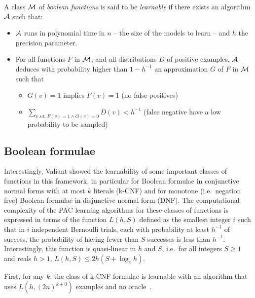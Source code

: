 \documentclass{llncs}
\begin{document}
\begin{definition}
   A class $\cal M$ of \emph{boolean functions} is said to be \emph{learnable}
   if there exists an algorithm $\cal A$ such that:
   \begin{itemize}
      \item $\cal A$ runs in polynomial time in $n$ -- the size of the models to learn -- and $h$ the precision parameter.
      \item
         For all functions $F$ in $\cal M$, and all distributions $D$ of positive examples,
         $\cal A$ deduces with probability higher than $1-h^{-1}$ an approximation $G$ of $F$ in $\cal M$ such that
         \begin{itemize}
            \item $G(v)=1$ implies $F(v)=1$ (no false positives)
            \item
               $\sum_{v\ s.t.\ F(v)=1\wedge G(v)=0} D(v) < h^{-1}$ (false negative have a low probability to be sampled)
         \end{itemize}
   \end{itemize}
\end{definition}


\subsection{Boolean formulae}

Interestingly, Valiant showed the learnability of some important classes of functions in this framework,
in particular for Boolean formulae in conjunctive normal forms with at most $k$ literals (k-CNF)
and for monotone (i.e.~negation free) Boolean formulae in disjunctive normal form (DNF).
The computational complexity of the PAC learning algorithms for these classes of functions is expressed in terms of the function
$L(h,S)$ defined as the smallest integer $i$ such that
in $i$ independent Bernoulli trials, each with probability at least $h^{-1}$ of success, the probability of having fewer than $S$ successes is less than $h^{-1}$.
Interestingly, this function is quasi-linear in $h$ and $S$, i.e.~for all
integers $S\ge 1$ and reals $h>1$, $L(h,S) \le 2h(S+\log_e h)$.

\begin{theorem}\label{thm:kcnf}
First, for any $k$, the class of k-CNF formulae is learnable with an
algorithm that uses $L(h,{(2 n)}^{k+0})$ examples and no oracle~\cite{Valiant84cacm}.
\end{theorem}
\end{document}
